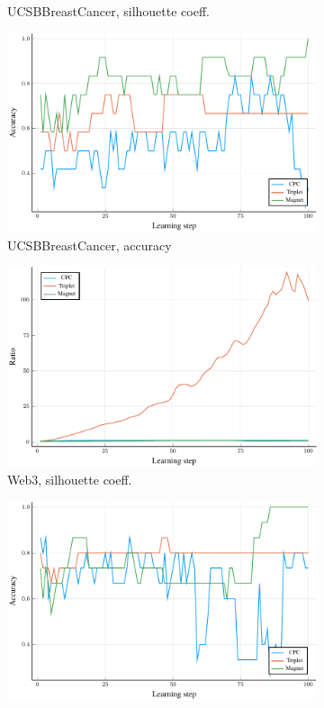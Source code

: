 \begin{figure}
\begin{subfigure}[t]{0.49\textwidth}
    \caption{UCSBBreastCancer, silhouette coeff.}
  \end{subfigure}
  \begin{subfigure}[t]{0.49\textwidth}
    \centering
    \includegraphics[width=\textwidth]{images/UCSBBreastCancer_accuracy/UCSBBreastCancer_accuracy.pdf}
    \caption{UCSBBreastCancer, accuracy}
  \end{subfigure}
  \begin{subfigure}[t]{0.49\textwidth}
    \centering
    \includegraphics[width=\textwidth]{images/Web3_ratio/Web3_ratio.pdf}
    \caption{Web3, silhouette coeff.}
  \end{subfigure}
  \begin{subfigure}[t]{0.49\textwidth}
    \centering
    \includegraphics[width=\textwidth]{images/Web3_accuracy/Web3_accuracy.pdf}

\end{subfigure}
\end{figure}
